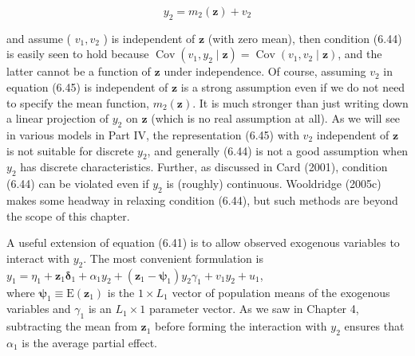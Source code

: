 \documentclass[10pt]{article}
\begin{document}
\begin{equation*}
y_{2}=m_{2}(\mathbf{z})+v_{2} \tag{6.45}
\end{equation*}


and assume ( $v_{1}, v_{2}$ ) is independent of $\mathbf{z}$ (with zero mean), then condition (6.44) is easily seen to hold because $\operatorname{Cov}\left(v_{1}, y_{2} \mid \mathbf{z}\right)=\operatorname{Cov}\left(v_{1}, v_{2} \mid \mathbf{z}\right)$, and the latter cannot be a function of $\mathbf{z}$ under independence. Of course, assuming $v_{2}$ in equation (6.45) is independent of $\mathbf{z}$ is a strong assumption even if we do not need to specify the mean function, $m_{2}(\mathbf{z})$. It is much stronger than just writing down a linear projection of $y_{2}$ on $\mathbf{z}$ (which is no real assumption at all). As we will see in various models in Part IV, the representation (6.45) with $v_{2}$ independent of $\mathbf{z}$ is not suitable for discrete $y_{2}$, and generally (6.44) is not a good assumption when $y_{2}$ has discrete characteristics. Further, as discussed in Card (2001), condition (6.44) can be violated even if $y_{2}$ is (roughly) continuous. Wooldridge (2005c) makes some headway in relaxing condition (6.44), but such methods are beyond the scope of this chapter.

A useful extension of equation (6.41) is to allow observed exogenous variables to interact with $y_{2}$. The most convenient formulation is\\
$y_{1}=\eta_{1}+\mathbf{z}_{1} \boldsymbol{\delta}_{1}+\alpha_{1} y_{2}+\left(\mathbf{z}_{1}-\boldsymbol{\psi}_{1}\right) y_{2} \gamma_{1}+v_{1} y_{2}+u_{1}$,\\
where $\boldsymbol{\psi}_{1} \equiv \mathrm{E}\left(\mathbf{z}_{1}\right)$ is the $1 \times L_{1}$ vector of population means of the exogenous variables and $\gamma_{1}$ is an $L_{1} \times 1$ parameter vector. As we saw in Chapter 4, subtracting the mean from $\mathbf{z}_{1}$ before forming the interaction with $y_{2}$ ensures that $\alpha_{1}$ is the average partial effect.
\end{document}
